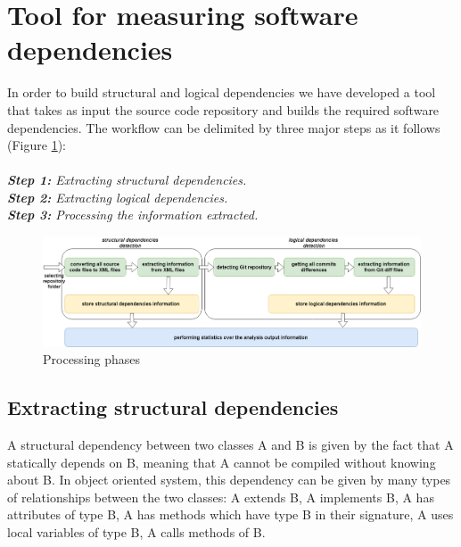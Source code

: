 \documentclass[a4paper,twoside]{article}
\begin{document}
\section{Tool for measuring software dependencies}
\label{sec:tool}

In order to build structural and logical dependencies we have developed a tool that takes as input the source code repository and builds the required software dependencies. The workflow can be delimited by three major steps as it follows (Figure \ref{fig:fig3}):\\ \\
\textit{\textbf{Step 1:} Extracting structural dependencies.}\\
\textit{\textbf{Step 2:} Extracting logical dependencies.}\\
\textit{\textbf{Step 3:} Processing the information extracted.}



\begin{figure}[htb]
\centering
\includegraphics[width=\textwidth]{fig3.png}
\caption{Processing phases}
\label{fig:fig3}
\end{figure}

\subsection{ Extracting structural dependencies}

A structural dependency between two classes A and B is given by the fact that A statically depends on B, meaning that A cannot be compiled without knowing about B. In object oriented system, this dependency can be given by many types of relationships between the two classes: A extends B, A implements B, A has attributes of type B, A has methods which have type B in their signature, A uses local variables of type B, A calls methods of B.
\end{document}

